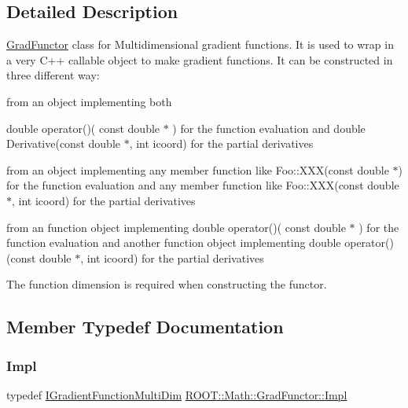 \subsection{Detailed Description}
\mbox{\hyperlink{classROOT_1_1Math_1_1GradFunctor}{Grad\+Functor}} class for Multidimensional gradient functions. It is used to wrap in a very C++ callable object to make gradient functions. It can be constructed in three different way\+: 
\begin{DoxyEnumerate}
\item from an object implementing both

double operator()( const double $\ast$ ) for the function evaluation and double Derivative(const double $\ast$, int icoord) for the partial derivatives 
\item from an object implementing any member function like Foo\+::\+X\+X\+X(const double $\ast$) for the function evaluation and any member function like Foo\+::\+X\+X\+X(const double $\ast$, int icoord) for the partial derivatives 
\item from an function object implementing double operator()( const double $\ast$ ) for the function evaluation and another function object implementing double operator() (const double $\ast$, int icoord) for the partial derivatives 
\end{DoxyEnumerate}The function dimension is required when constructing the functor. 

\subsection{Member Typedef Documentation}
\mbox{\label{classROOT_1_1Math_1_1GradFunctor_a4ce94e1b525d38a2d7da3c88ace6e0f9}} 
\subsubsection{\texorpdfstring{Impl}{Impl}\hspace{0.1cm}{\footnotesize\ttfamily [1/3]}}
{\footnotesize\ttfamily typedef \mbox{\hyperlink{classROOT_1_1Math_1_1IGradientFunctionMultiDim}{I\+Gradient\+Function\+Multi\+Dim}} \mbox{\hyperlink{classROOT_1_1Math_1_1GradFunctor_a4ce94e1b525d38a2d7da3c88ace6e0f9}{R\+O\+O\+T\+::\+Math\+::\+Grad\+Functor\+::\+Impl}}}

\mbox{\label{classROOT_1_1Math_1_1GradFunctor_a4ce94e1b525d38a2d7da3c88ace6e0f9}} 
